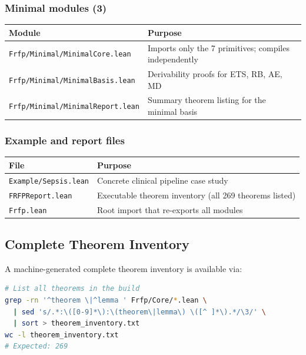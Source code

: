 \subsubsection*{Minimal modules (3)}

\begin{center}
\begin{tabular}{ll}
\toprule
Module & Purpose \\
\midrule
\texttt{Frfp/Minimal/MinimalCore.lean} & Imports only the 7 primitives; compiles independently \\
\texttt{Frfp/Minimal/MinimalBasis.lean} & Derivability proofs for ETS, RB, AE, MD \\
\texttt{Frfp/Minimal/MinimalReport.lean} & Summary theorem listing for the minimal basis \\
\bottomrule
\end{tabular}
\end{center}

\subsubsection*{Example and report files}

\begin{center}
\begin{tabular}{ll}
\toprule
File & Purpose \\
\midrule
\texttt{Example/Sepsis.lean} & Concrete clinical pipeline case study \\
\texttt{FRFPReport.lean} & Executable theorem inventory (all 269 theorems listed) \\
\texttt{Frfp.lean} & Root import that re-exports all modules \\
\bottomrule
\end{tabular}
\end{center}

\subsection{Complete Theorem Inventory}

A machine-generated complete theorem inventory is available via:

\begin{lstlisting}[language=bash]
# List all theorems in the build
grep -rn '^theorem \|^lemma ' Frfp/Core/*.lean \
  | sed 's/.*:\([0-9]*\):\(theorem\|lemma\) \([^ ]*\).*/\3/' \
  | sort > theorem_inventory.txt
wc -l theorem_inventory.txt
# Expected: 269
\end{lstlisting}

